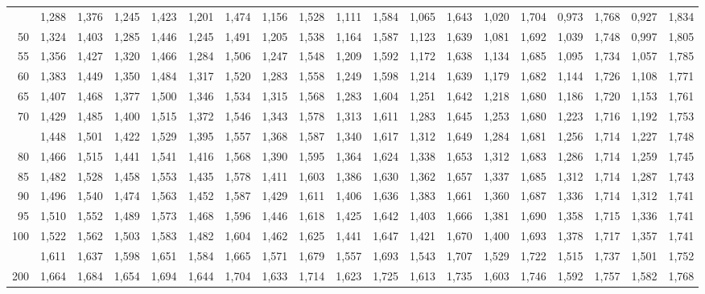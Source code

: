 \documentclass[12pt,a4paper]{article}
\begin{document}
{\begin{longtable}{@{\extracolsep{\fill}}rcccccccccccccccccc@{}}
\addlinespace[2pt]
45 & 1,288 & 1,376 & 1,245 & 1,423 & 1,201 & 1,474 & 1,156 & 1,528 & 1,111 & 1,584 & 1,065 & 1,643 & 1,020 & 1,704 & 0,973 & 1,768 & 0,927 & 1,834 \\
50 & 1,324 & 1,403 & 1,285 & 1,446 & 1,245 & 1,491 & 1,205 & 1,538 & 1,164 & 1,587 & 1,123 & 1,639 & 1,081 & 1,692 & 1,039 & 1,748 & 0,997 & 1,805 \\
55 & 1,356 & 1,427 & 1,320 & 1,466 & 1,284 & 1,506 & 1,247 & 1,548 & 1,209 & 1,592 & 1,172 & 1,638 & 1,134 & 1,685 & 1,095 & 1,734 & 1,057 & 1,785 \\
60 & 1,383 & 1,449 & 1,350 & 1,484 & 1,317 & 1,520 & 1,283 & 1,558 & 1,249 & 1,598 & 1,214 & 1,639 & 1,179 & 1,682 & 1,144 & 1,726 & 1,108 & 1,771 \\
65 & 1,407 & 1,468 & 1,377 & 1,500 & 1,346 & 1,534 & 1,315 & 1,568 & 1,283 & 1,604 & 1,251 & 1,642 & 1,218 & 1,680 & 1,186 & 1,720 & 1,153 & 1,761 \\
70 & 1,429 & 1,485 & 1,400 & 1,515 & 1,372 & 1,546 & 1,343 & 1,578 & 1,313 & 1,611 & 1,283 & 1,645 & 1,253 & 1,680 & 1,223 & 1,716 & 1,192 & 1,753 \\
\addlinespace[2pt]
75 & 1,448 & 1,501 & 1,422 & 1,529 & 1,395 & 1,557 & 1,368 & 1,587 & 1,340 & 1,617 & 1,312 & 1,649 & 1,284 & 1,681 & 1,256 & 1,714 & 1,227 & 1,748 \\
80 & 1,466 & 1,515 & 1,441 & 1,541 & 1,416 & 1,568 & 1,390 & 1,595 & 1,364 & 1,624 & 1,338 & 1,653 & 1,312 & 1,683 & 1,286 & 1,714 & 1,259 & 1,745 \\
85 & 1,482 & 1,528 & 1,458 & 1,553 & 1,435 & 1,578 & 1,411 & 1,603 & 1,386 & 1,630 & 1,362 & 1,657 & 1,337 & 1,685 & 1,312 & 1,714 & 1,287 & 1,743 \\
90 & 1,496 & 1,540 & 1,474 & 1,563 & 1,452 & 1,587 & 1,429 & 1,611 & 1,406 & 1,636 & 1,383 & 1,661 & 1,360 & 1,687 & 1,336 & 1,714 & 1,312 & 1,741 \\
95 & 1,510 & 1,552 & 1,489 & 1,573 & 1,468 & 1,596 & 1,446 & 1,618 & 1,425 & 1,642 & 1,403 & 1,666 & 1,381 & 1,690 & 1,358 & 1,715 & 1,336 & 1,741 \\
100 & 1,522 & 1,562 & 1,503 & 1,583 & 1,482 & 1,604 & 1,462 & 1,625 & 1,441 & 1,647 & 1,421 & 1,670 & 1,400 & 1,693 & 1,378 & 1,717 & 1,357 & 1,741 \\
\addlinespace[2pt]
150 & 1,611 & 1,637 & 1,598 & 1,651 & 1,584 & 1,665 & 1,571 & 1,679 & 1,557 & 1,693 & 1,543 & 1,707 & 1,529 & 1,722 & 1,515 & 1,737 & 1,501 & 1,752 \\
200 & 1,664 & 1,684 & 1,654 & 1,694 & 1,644 & 1,704 & 1,633 & 1,714 & 1,623 & 1,725 & 1,613 & 1,735 & 1,603 & 1,746 & 1,592 & 1,757 & 1,582 & 1,768 \\
\end{longtable}
}
\end{document}

